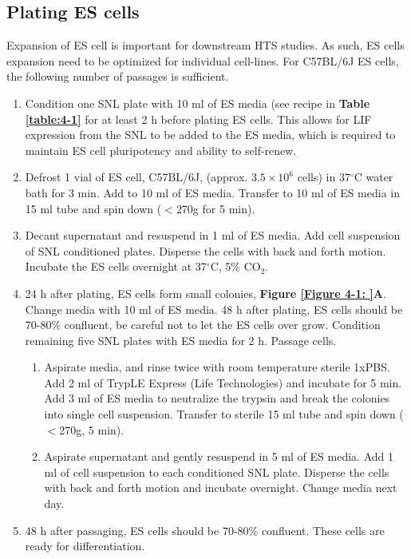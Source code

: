 \subsection{Plating ES cells}

Expansion of ES cell is important for downstream HTS studies. As such, ES cells expansion need to be optimized for individual cell-lines. For C57BL/6J ES cells, the following number of passages is sufficient.

\begin{enumerate}
\item Condition one SNL plate with 10 ml of ES media (see recipe in \textbf{Table \ref{table:4-1}} for at least 2 h before plating ES cells. This allows for LIF expression from the SNL to be added to the ES media, which is required to maintain ES cell pluripotency and ability to self-renew.
\item Defrost 1 vial of ES cell, C57BL/6J, (approx. \(3.5 \times 10^6\) cells) in 37$^{\circ}$C water bath for 3 min. Add to 10 ml of ES media. Transfer to 10 ml of ES media in 15 ml tube and spin down (\( < \)270g for 5 min).
\item Decant supernatant and resuspend in 1 ml of ES media. Add cell suspension of SNL conditioned plates. Disperse the cells with back and forth motion. Incubate the ES cells overnight at 37$^{\circ}$C, 5\% CO\(_2\).
\item 24 h after plating, ES cells form small colonies, \textbf{Figure \ref{Figure 4-1: }A}. Change media with 10 ml of ES media. 48 h after plating, ES cells should be 70-80\% confluent, be careful not to let the ES cells over grow. Condition remaining five SNL plates with ES media for 2 h. Passage cells.
  \begin{enumerate}
  \item Aspirate media, and rinse twice with room temperature sterile 1xPBS. Add 2 ml of TrypLE Express (Life Technologies) and incubate for 5 min. Add 3 ml of ES media to neutralize the trypsin and break the colonies into single cell suspension. Transfer to sterile 15 ml tube and spin down (\( < \)270g, 5 min).
  \item Aspirate supernatant and gently resuspend in 5 ml of ES media. Add 1 ml of cell suspension to each conditioned SNL plate. Disperse the cells with back and forth motion and incubate overnight. Change media next day.
  \end{enumerate}
\item 48 h after passaging, ES cells should be 70-80\% confluent. These cells are ready for differentiation.
\end{enumerate}

